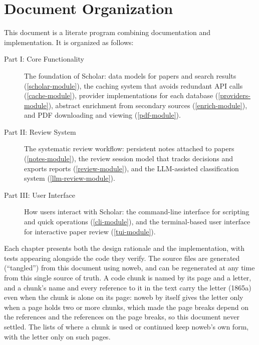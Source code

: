 \section{Document Organization}

This document is a literate program combining documentation and implementation.
It is organized as follows:

\begin{description}
\item[Part I: Core Functionality] The foundation of Scholar: data models for
  papers and search results (\cref{scholar-module}), the caching system that
  avoids redundant API calls (\cref{cache-module}), provider implementations
  for each database (\cref{providers-module}), abstract enrichment from
  secondary sources (\cref{enrich-module}), and PDF downloading and viewing
  (\cref{pdf-module}).
\item[Part II: Review System] The systematic review workflow: persistent notes
  attached to papers (\cref{notes-module}), the review session model that
  tracks decisions and exports reports (\cref{review-module}), and the
  LLM-assisted classification system (\cref{llm-review-module}).
\item[Part III: User Interface] How users interact with Scholar: the
  command-line interface for scripting and quick operations
  (\cref{cli-module}), and the terminal-based user interface for interactive
  paper review (\cref{tui-module}).
\end{description}

Each chapter presents both the design rationale and the implementation, with
tests appearing alongside the code they verify.
The source files are generated (\enquote{tangled}) from this document using
noweb, and can be regenerated at any time from this single source of truth.
A code chunk is named by its page and a letter, and a chunk's name and
every reference to it in the text carry the letter (1865a) even when
the chunk is alone on its page: noweb by itself gives the letter only
when a page holds two or more chunks, which made the page breaks
depend on the references and the references on the page breaks, so
this document never settled.
The lists of where a chunk is used or continued keep noweb's own form,
with the letter only on such pages.
